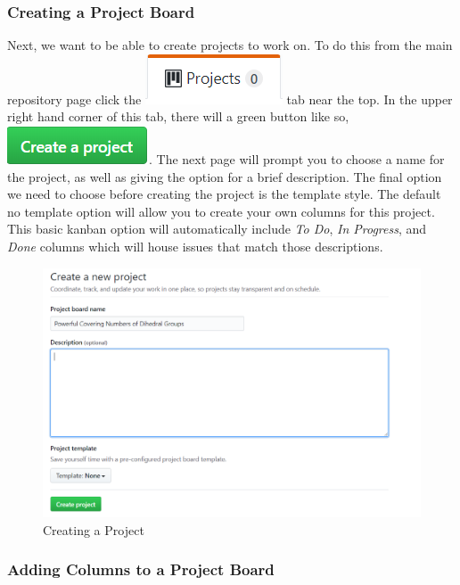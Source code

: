 \documentclass[11pt]{article}
\begin{document}
\subsubsection{Creating a Project Board}
Next, we want to be able to create projects to work on. To do this from the main repository page click the \includegraphics[scale=.5]{ProjectsTab.png} tab near the top. In the upper right hand corner of this tab, there will a green button like so, \includegraphics[scale=.5]{CreateAProject.png}. The next page will prompt you to choose a name for the project, as well as giving the option for a brief description. The final option we need to choose before creating the project is the template style. The default no template option will allow you to create your own columns for this project. This basic kanban option will automatically include \textit{To Do}, \textit{In Progress}, and \textit{Done} columns which will house issues that match those descriptions. 

\begin{center}
\begin{figure}[h!]
\includegraphics[scale=.6]{CreatingProject.png}
\caption{Creating a Project}
\end{figure}
\end{center} 
\subsubsection{Adding Columns to a Project Board}
\end{document}
